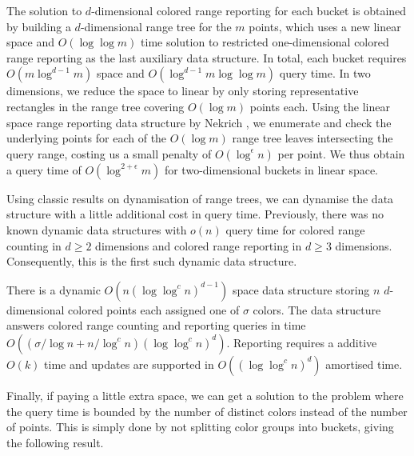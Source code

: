 The solution to $d$-dimensional colored range reporting for each bucket is obtained by building a $d$-dimensional range tree for the $m$ points, which uses a new linear space and $O(\log \log m)$ time solution to restricted one-dimensional colored range reporting as the last auxiliary data structure. In total, each bucket requires $O(m \log ^{d-1} m)$ space and $O(\log ^{d-1} m \log \log m)$ query time. In two dimensions, we reduce the space to linear by only storing representative rectangles in the range tree covering $O(\log m)$ points each. Using the linear space range reporting data structure by Nekrich \cite{nekrich2009orthogonal}, we enumerate and check the underlying points for each of the $O(\log m)$ range tree leaves intersecting the query range, costing us a small penalty of $O(\log ^{\epsilon} n)$ per point. We thus obtain a query time of $O(\log ^{2+\epsilon} m)$ for two-dimensional buckets in linear space.


\vspace{0.5em}
Using classic results on dynamisation of range trees, we can dynamise the data structure with a little additional cost in query time. Previously, there was no known dynamic data structures with $o(n)$ query time for colored range counting in $d \geq 2$ dimensions and colored range reporting in $d \geq 3$ dimensions. Consequently, this is the first such dynamic data structure.

\begin{theorem}\label{thm:dyn-dD}
    There is a dynamic $O(n (\log \log ^{c} n) ^{d-1})$ space data structure storing $n$ $d$-dimensional colored points each assigned one of $\sigma$ colors. The data structure answers colored range counting and reporting queries in time $O(( \sigma / \log n + n / \log ^c n ) (\log \log ^{c} n) ^{d})$. Reporting requires a additive $O(k)$ time and updates are supported in $O((\log \log ^c n) ^d)$ amortised time.
\end{theorem}

Finally, if paying a little extra space, we can get a solution to the problem where the query time is bounded by the number of distinct colors instead of the number of points. This is simply done by not splitting color groups into buckets, giving the following result. 

